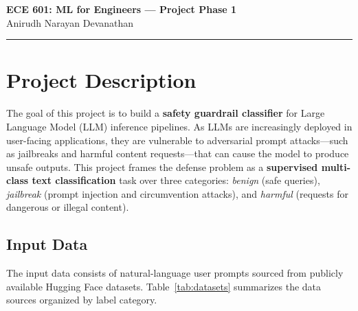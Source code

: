 \documentclass[11pt]{article}
\begin{document}
\begin{center}
    {\Large \textbf{ECE 601: ML for Engineers --- Project Phase 1}} \\[6pt]
    {\large Anirudh Narayan Devanathan}
\end{center}

\vspace{-4pt}
\noindent\rule{\textwidth}{0.4pt}

\section*{Project Description}

The goal of this project is to build a \textbf{safety guardrail classifier} for Large Language Model (LLM) inference pipelines. As LLMs are increasingly deployed in user-facing applications, they are vulnerable to adversarial prompt attacks---such as jailbreaks and harmful content requests---that can cause the model to produce unsafe outputs. This project frames the defense problem as a \textbf{supervised multi-class text classification} task over three categories: \textit{benign} (safe queries), \textit{jailbreak} (prompt injection and circumvention attacks), and \textit{harmful} (requests for dangerous or illegal content).

\subsection*{Input Data}

The input data consists of natural-language user prompts sourced from publicly available Hugging Face datasets. Table~\ref{tab:datasets} summarizes the data sources organized by label category.
\end{document}

